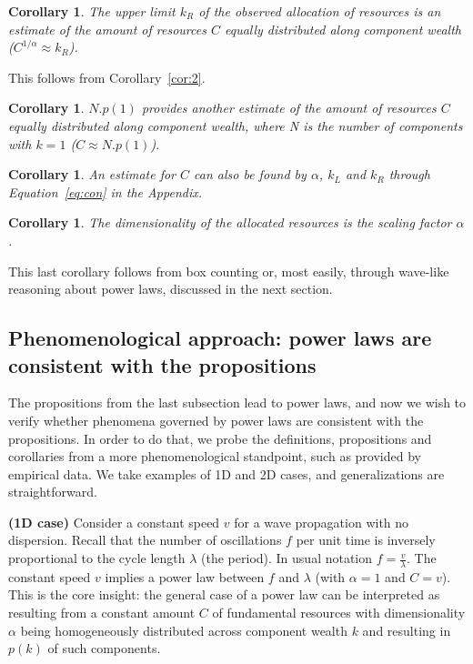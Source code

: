 \documentclass[10pt,letterpaper]{article}
\newtheorem{corollary}[theorem2]{Corollary}
\begin{document}

\begin{corollary}
  The upper limit $k_R$ of the observed allocation of resources is an estimate of the amount of resources $C$ equally distributed along component wealth ($C^{1/\alpha}\approx k_R$).
\end{corollary}

This follows from Corollary~\ref{cor:2}.

\begin{corollary}
	$N . p(1)$ provides another estimate of the amount of resources $C$ equally distributed along component wealth, where N is the number of components with $k=1$ ($C\approx N . p(1)$).
\end{corollary}

\begin{corollary}
	An estimate for $C$ can also be found by $\alpha$, $k_L$ and $k_R$ through Equation~\ref{eq:con} in the Appendix.
\end{corollary}

\begin{corollary}
	The dimensionality of the allocated resources is the scaling factor $\alpha$.
\end{corollary}

This last corollary follows from box counting or, most easily,
through wave-like reasoning about power laws, discussed in the next section.

\subsection{Phenomenological approach: power laws are consistent with the propositions}\label{sec:phen}

The propositions from the last subsection lead to power laws, and now we wish to verify whether phenomena governed by power laws are consistent with the propositions. In order to do that, we probe the definitions, propositions and corollaries from a more phenomenological standpoint, such as provided by empirical data. We take examples of 1D and 2D cases, and generalizations are straightforward.  


{\bf (1D case)} Consider a constant speed $v$ for a wave propagation with no dispersion.
Recall that the number of oscillations $f$ per unit time is
inversely proportional to the cycle length $\lambda$ (the period).
In usual notation $f=\frac{v}{\lambda}$.
The constant speed $v$ implies a power law between 
$f$ and $\lambda$ (with $\alpha=1$ and $C=v$).
This is the core insight: the general case of a power law can
be interpreted as resulting from a constant amount $C$ of
fundamental resources with dimensionality $\alpha$ 
being homogeneously distributed across
component wealth $k$ and resulting in $p(k)$ of such components.
\end{document}
